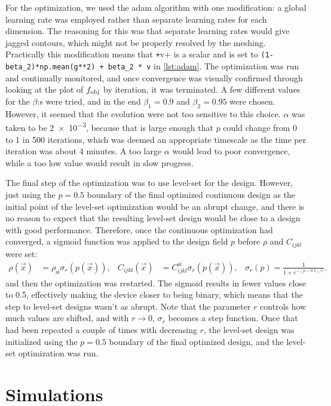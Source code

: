 For the optimization, we used the \gls{adam}
algorithm with one modification:
a global learning rate was employed rather than
separate learning rates for each dimension.
The reasoning for this was that separate learning
rates would give jagged contours, which might not be properly resolved by the
meshing. Practically this modification means that \texttt+v+ is a
scalar and is set to \texttt{(1-beta_2)*np.mean(g**2) + beta_2 * v}
in \cref{lst:adam}.
The optimization was run and continually monitored, and once convergence was
visually confirmed through looking at the plot of $f_\text{obj}$ by iteration, it was terminated.
A few different values for the $\beta$:s were tried, and in the end
$\beta_1=0.9$ and $\beta_2 = 0.95$ were chosen.
However, it seemed that the evolution were not too sensitive to this choice.
$\alpha$ was taken to be \num{2e-3}, because that is large enough that $p$
could change from 0 to 1 in 500 iterations, which was deemed an appropriate
timescale as the time per iteration was about 4 minutes.
A too large $\alpha$ would lead to poor convergence, while a too low value would
result in slow progress.

The final step of the optimization was to use level-set for the design.
However, just using the $p=0.5$ boundary of the final optimized continuous
design as the initial point of the level-set optimization would be an abrupt
change, and there is no reason to expect that the resulting level-set design
would be close to a design with good performance.
Therefore, once the continuous optimization had converged, a sigmoid function
was applied to the design field $p$ before $\rho$ and $C_{ijkl}$ were set:
\begin{align}
	\rho(\vec x) &= \rho_\text{si} \sigma_r(p(\vec x)),
	&
	C_{ijkl}(\vec x) &= C_{ijkl}^\text{si} \sigma_r(p(\vec x)),
	&
	\sigma_r(p) = \frac{1}{1+e^{-(p-0.5)/r}}.
\end{align}
and then the optimization was restarted.
The sigmoid results in fewer values close to 0.5, effectively making the device
closer to being binary, which means that the step to level-set designs wasn't as
abrupt.
Note that the parameter $r$ controls how much values are shifted, and with
$r\to 0$, $\sigma_r$ becomes a step function.
Once that had been repeated a couple of times with decreasing $r$,
the level-set design was
initialized using the $p=0.5$ boundary of the final optimized design,
and the level-set optimization was run.

\section{Simulations}


